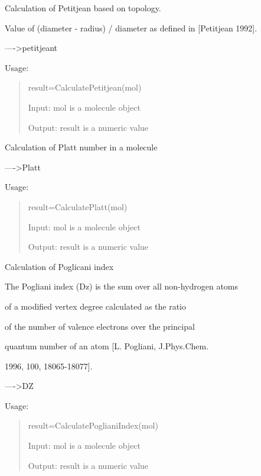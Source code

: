 \documentclass[letterpaper,10pt,english]{sphinxmanual}
\begin{document}

\begin{fulllineitems}
\label{reference/topology:topology.CalculatePetitjean}
Calculation of Petitjean based on topology.

Value of (diameter - radius) / diameter as defined in {[}Petitjean 1992{]}.

----\textgreater{}petitjeant

Usage:
\begin{quote}

result=CalculatePetitjean(mol)

Input: mol is a molecule object

Output: result is a numeric value
\end{quote}

\end{fulllineitems}


\begin{fulllineitems}
\label{reference/topology:topology.CalculatePlatt}
Calculation of Platt number in a molecule

----\textgreater{}Platt

Usage:
\begin{quote}

result=CalculatePlatt(mol)

Input: mol is a molecule object

Output: result is a numeric value
\end{quote}

\end{fulllineitems}


\begin{fulllineitems}
\label{reference/topology:topology.CalculatePoglianiIndex}
Calculation of Poglicani index

The Pogliani index (Dz) is the sum over all non-hydrogen atoms

of a modified vertex degree calculated as the ratio

of the number of valence electrons over the principal

quantum number of an atom {[}L. Pogliani, J.Phys.Chem.

1996, 100, 18065-18077{]}.

----\textgreater{}DZ

Usage:
\begin{quote}

result=CalculatePoglianiIndex(mol)

Input: mol is a molecule object

Output: result is a numeric value
\end{quote}

\end{fulllineitems}
\end{document}
